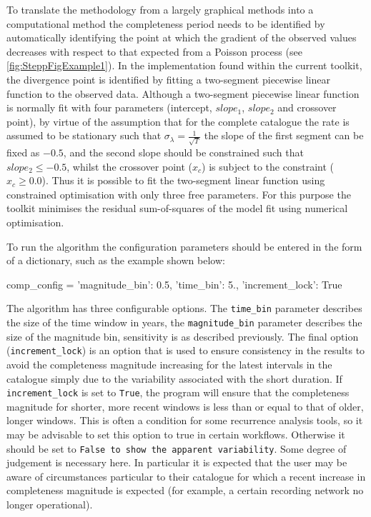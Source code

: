 To translate the methodology from a largely graphical methods into a computational method the completeness period needs to be identified by automatically identifying the point at which the gradient of the observed values decreases with respect to that expected from a Poisson process (see \ref{fig:SteppFigExample1}). In the implementation found within the current toolkit, the divergence point is identified by fitting a two-segment piecewise linear function to the observed data. Although a two-segment piecewise linear function is normally fit with four parameters (intercept, $slope_1$, $slope_2$ and crossover point), by virtue of the assumption that for the complete catalogue the rate is assumed to be stationary such that $\sigma_{\lambda} = \frac{1}{\sqrt{T}}$ the slope of the first segment can be fixed as $-0.5$, and the second slope should be constrained such that $slope_2 \leq -0.5$, whilst the crossover point ($x_c$) is subject to the constraint ($x_c \geq 0.0$). Thus it is possible to fit the two-segment linear function using constrained optimisation with only three free parameters. For this purpose the toolkit minimises the residual sum-of-squares of the model fit using numerical optimisation. 

To run the \textcite{Stepp1971} algorithm the configuration parameters should be entered in the form of a dictionary, such as the example shown below:

\begin{python}[frame=single]
comp_config = {'magnitude_bin': 0.5,
               'time_bin': 5.,
               'increment_lock': True}
\end{python}

The algorithm has three configurable options. The \verb=time_bin= parameter describes the size of the time window in years, the \verb=magnitude_bin= parameter describes the size of the magnitude bin, sensitivity is as described previously. The final option (\verb=increment_lock=) is an option that is used to ensure consistency in the results to avoid the completeness magnitude increasing for the latest intervals in the catalogue simply due to the variability associated with the short duration. If \verb=increment_lock= is set to \verb=True=, the program will ensure that the completeness magnitude for shorter, more recent windows is less than or equal to that of older, longer windows. This is often a condition for some recurrence analysis tools, so it may be advisable to set this option to true in certain workflows. Otherwise it should be set to \verb=False to show the apparent variability=. Some degree of judgement is necessary here. In particular it is expected that the user may be aware of circumstances particular to their catalogue for which a recent increase in completeness magnitude is expected (for example, a certain recording network no longer operational).  


